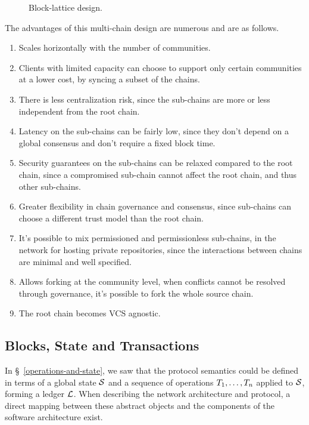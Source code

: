 \begin{figure}[htp]
    
    \caption{Block-lattice design.}
\end{figure}

\bigskip

The advantages of this multi-chain design are numerous and are as follows.

\begin{enumerate}
    \item Scales horizontally with the number of communities.
    \item Clients with limited capacity can choose to support only certain
        communities at a lower cost, by syncing a subset of the chains.
    \item There is less centralization risk, since the sub-chains are more or
        less independent from the root chain.
    \item Latency on the sub-chains can be fairly low, since they don’t depend
        on a global consensus and don’t require a fixed block time.
    \item Security guarantees on the sub-chains can be relaxed compared to the
        root chain, since a compromised sub-chain cannot affect the root chain,
        and thus other sub-chains.
    \item Greater flexibility in chain governance and consensus, since
        sub-chains can choose a different trust model than the root chain.
    \item It's possible to mix permissioned and permissionless sub-chains,
        in the network \eg for hosting private repositories, since the
        interactions between chains are minimal and well specified.
    \item Allows forking at the community level, \eg when conflicts cannot be
        resolved through governance, it's possible to fork the whole source
        chain.
    \item The root chain becomes VCS agnostic.
\end{enumerate}

\subsection{Blocks, State and Transactions}

In \S~\ref{operations-and-state}, we saw that the protocol semantics could
be defined in terms of a global state $\mathcal{S}$ and a sequence of operations
$T_1,\dots,T_n$ applied to $\mathcal{S}$, forming a ledger $\mathcal{L}$. When
describing the network architecture and protocol, a direct mapping between
these abstract objects and the components of the software architecture exist.


